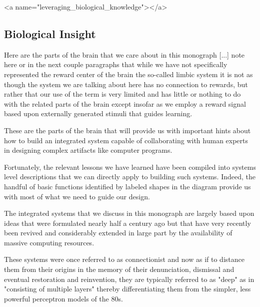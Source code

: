 
\rawhtml
<a name="leveraging_biological_knowledge"></a>
\endrawhtml
\subsection*{Biological Insight}


Here are the parts of the brain that we care about in this monograph [...] note here or in the next couple paragraphs that while we have not specifically represented the reward center of the brain \emdash{} the so-called limbic system \emdash{} it is not as though the system we are talking about here has no connection to rewards, but rather that our use of the term is very limited and has little or nothing to do with the related parts of the brain except insofar as we employ a reward signal based upon externally generated stimuli that guides learning.

These are the parts of the brain that will provide us with important hints about how to build an integrated system capable of collaborating with human experts in designing complex artifacts like computer programs.

Fortunately, the relevant lessons we have learned have been compiled into systems level descriptions that we can directly apply to building such systems. Indeed, the handful of basic functions identified by labeled shapes in the diagram provide us with most of what we need to guide our design.

The integrated systems that we discuss in this monograph are largely based upon ideas that were formulated nearly half a century ago but that have very recently been revived and considerably extended in large part by the availability of massive computing resources.

These systems were once referred to as connectionist and now as if to distance them from their origins in the memory of their denunciation, dismissal and eventual restoration and reinvention, they are typically referred to as "deep" as in "consisting of multiple layers" thereby differentiating them from the simpler, less powerful perceptron models of the 80s.

